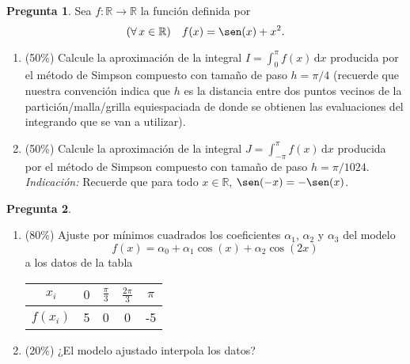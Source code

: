 \documentclass[letter,12pt]{article}
\theoremstyle{definition}
\newtheorem{question}{Pregunta}
\numberwithin{equation}{question}
\begin{document}
\newpage
\begin{question} Sea $f \colon \mathbb{R} \to \mathbb{R}$ la función definida por
%
\begin{equation*}
(\forall\,x\in\mathbb{R}) \quad f(x) = \sen(x) + x^2.
\end{equation*}
%
\begin{enumerate}
\item\label{it:coarse} (50\%) Calcule la aproximación de la integral $I = \int_0^\pi f(x) \, \mathrm{d}x$ producida por el método de Simpson compuesto con tamaño de paso $h = \pi/4$ (recuerde que nuestra convención indica que $h$ es la distancia entre dos puntos vecinos de la partición/malla/grilla equiespaciada de donde se obtienen las evaluaciones del integrando que se van a utilizar).
\item\label{it:fine} (50\%) Calcule la aproximación de la integral $J = \int_{-\pi}^\pi f(x) \, \mathrm{d}x$ producida por el método de Simpson compuesto con tamaño de paso $h = \pi/1024$.
\emph{Indicación:} Recuerde que para todo $x \in \mathbb{R}$, $\sen(-x) = -\sen(x)$.
\end{enumerate}
\end{question}

\newpage
\begin{question}\hfill
\begin{enumerate}
\item\label{it:fit} (80\%) Ajuste por mínimos cuadrados los coeficientes $\alpha_1$, $\alpha_2$ y $\alpha_3$ del modelo
%
\begin{equation*}
f(x) = \alpha_0 + \alpha_1 \cos(x) + \alpha_2 \cos(2 x)
\end{equation*}
%
a los datos de la tabla
%
\begin{center}
\begin{tabular}{c|cccc}
$x_i$ & $0$ & $\displaystyle\frac{\pi}{3}$ & $\displaystyle\frac{2\pi}{3}$ & $\pi$\\[1.5ex]\hline
$f(x_i)$ & 5 & 0 & 0 & -5
\end{tabular}
\end{center}
\item\label{it:assess} (20\%) ¿El modelo ajustado interpola los datos?
\end{enumerate}
\end{question}
\end{document}
